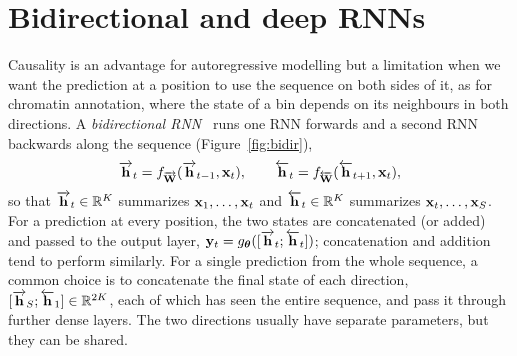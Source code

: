 \section{Bidirectional and deep RNNs}
\label{sec:bidir}

Causality is an advantage for autoregressive modelling but a limitation when we want the prediction at a position to use the sequence on both sides of it, as for chromatin annotation, where the state of a bin depends on its neighbours in both directions. A \emph{bidirectional RNN}~\citep{schuster1997} runs one RNN forwards and a second RNN backwards along the sequence (Figure~\ref{fig:bidir}),
\begin{equation}
  \overrightarrow{\mathbf{h}}_t = f_{\overrightarrow{\mathbf{W}}}(\overrightarrow{\mathbf{h}}_{t-1},\mathbf{x}_t), \qquad
  \overleftarrow{\mathbf{h}}_t = f_{\overleftarrow{\mathbf{W}}}(\overleftarrow{\mathbf{h}}_{t+1},\mathbf{x}_t),
\end{equation}
so that $\overrightarrow{\mathbf{h}}_t\in\mathbb{R}^K$ summarizes $\mathbf{x}_1,\dots,\mathbf{x}_t$ and $\overleftarrow{\mathbf{h}}_t\in\mathbb{R}^K$ summarizes $\mathbf{x}_t,\dots,\mathbf{x}_S$. For a prediction at every position, the two states are concatenated (or added) and passed to the output layer, $\mathbf{y}_t=g_{\boldsymbol{\theta}}([\overrightarrow{\mathbf{h}}_t;\overleftarrow{\mathbf{h}}_t])$; concatenation and addition tend to perform similarly. For a single prediction from the whole sequence, a common choice is to concatenate the final state of each direction, $[\overrightarrow{\mathbf{h}}_S;\overleftarrow{\mathbf{h}}_1]\in\mathbb{R}^{2K}$, each of which has seen the entire sequence, and pass it through further dense layers. The two directions usually have separate parameters, but they can be shared.


